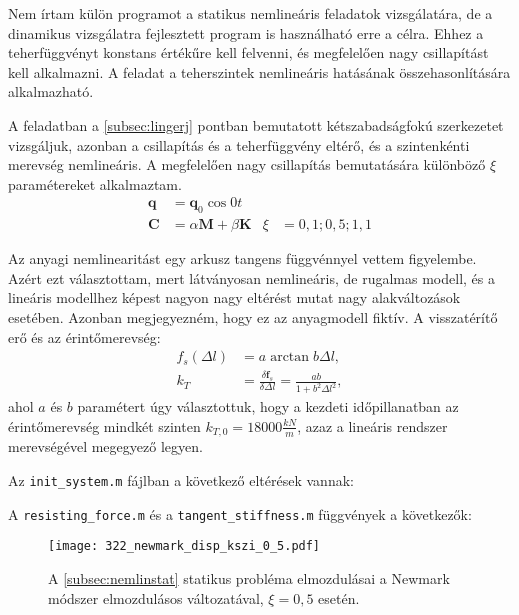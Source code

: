 Nem írtam külön programot a statikus nemlineáris feladatok vizsgálatára, de a dinamikus vizsgálatra fejlesztett program is használható erre a célra. Ehhez a teherfüggvényt konstans értékűre kell felvenni, és megfelelően nagy csillapítást kell alkalmazni. A feladat a teherszintek nemlineáris hatásának összehasonlítására alkalmazható.

A feladatban a \ref{subsec:lingerj} pontban bemutatott kétszabadságfokú szerkezetet vizsgáljuk, azonban a csillapítás és a teherfüggvény eltérő, és a szintenkénti merevség  nemlineáris. A megfelelően nagy csillapítás bemutatására különböző $\xi$ paramétereket alkalmaztam.
\begin{align*}
\mathbf{q} & = \mathbf{q}_0 \cos{0t} \\
\mathbf{C} & = \alpha\mathbf{M}+\beta\mathbf{K}  &   \xi & = 0,1 ; 0,5 ; 1,1 
\end{align*}

Az anyagi nemlinearitást  egy arkusz tangens függvénnyel vettem figyelembe.  Azért ezt választottam, mert látványosan nemlineáris, de rugalmas modell, és a lineáris modellhez képest nagyon nagy eltérést mutat nagy alakváltozások esetében. Azonban megjegyezném, hogy ez az anyagmodell  fiktív. A visszatérítő erő és az érintőmerevség: 
\begin{align*}
f_s(\Delta{l}) & = a \arctan{b\Delta{l}}, \\
k_T & = \frac{\delta\mathbf{f}_s}{\delta\Delta{l}} = \frac{ab}{1+b^2\Delta{l}^2},
\end{align*}
ahol $a$ és $b$ paramétert úgy választottuk, hogy a kezdeti időpillanatban az érintőmerevség mindkét szinten $k_{T,0} = 18000 \frac{kN}{m}$, azaz a lineáris rendszer merevségével megegyező legyen. 

Az \verb|init_system.m| fájlban a következő eltérések vannak:



A \verb|resisting_force.m| és a \verb|tangent_stiffness.m| függvények a következők:






\begin{figure}[h!]
\centering
\texttt{[image: 322\_newmark\_disp\_kszi\_0\_5.pdf]}
\caption{A \ref{subsec:nemlinstat} statikus probléma elmozdulásai a Newmark módszer elmozdulásos változatával, $\xi = 0,5$  esetén.}
\label{fig:322_newmark_disp_0_5}
\end{figure}

